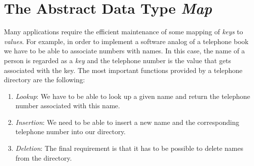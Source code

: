 \section[ADT Map]{The Abstract Data Type \emph{Map}} 
Many applications require the efficient maintenance of some mapping of \emph{keys} to
\emph{values}.  For example, in order to implement a software analog of a telephone book we have to
be able to associate numbers with names.  In this case, the name of a person is regarded as a
\emph{key} and the telephone number is the value that gets associated with the key.
The most important functions provided by a telephone directory are the following:
\begin{enumerate}
\item \textsl{Lookup}: We have to be able to look up a given name and return the telephone number
      associated with this name.
\item \textsl{Insertion}: We need to be able to insert a new name and the corresponding telephone
      number into our directory.
\item \textsl{Deletion}: The final requirement is that it has to be possible to delete names from
      the directory.
\end{enumerate}


